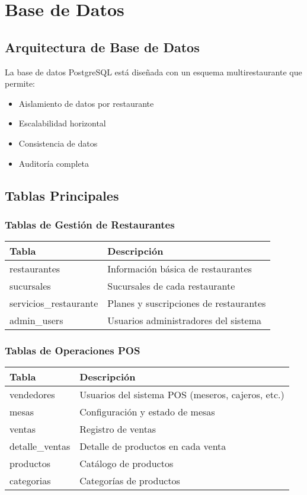 \documentclass[12pt,a4paper]{article}
\begin{document}
\section{Base de Datos}

\subsection{Arquitectura de Base de Datos}
La base de datos PostgreSQL está diseñada con un esquema multirestaurante que permite:
\begin{itemize}
    \item Aislamiento de datos por restaurante
    \item Escalabilidad horizontal
    \item Consistencia de datos
    \item Auditoría completa
\end{itemize}

\subsection{Tablas Principales}

\subsubsection{Tablas de Gestión de Restaurantes}
\begin{longtable}{|p{3cm}|p{10cm}|}
\hline
\textbf{Tabla} & \textbf{Descripción} \\
\hline
\endhead
restaurantes & Información básica de restaurantes \\
\hline
sucursales & Sucursales de cada restaurante \\
\hline
servicios\_restaurante & Planes y suscripciones de restaurantes \\
\hline
admin\_users & Usuarios administradores del sistema \\
\hline
\end{longtable}

\subsubsection{Tablas de Operaciones POS}
\begin{longtable}{|p{3cm}|p{10cm}|}
\hline
\textbf{Tabla} & \textbf{Descripción} \\
\hline
\endhead
vendedores & Usuarios del sistema POS (meseros, cajeros, etc.) \\
\hline
mesas & Configuración y estado de mesas \\
\hline
ventas & Registro de ventas \\
\hline
detalle\_ventas & Detalle de productos en cada venta \\
\hline
productos & Catálogo de productos \\
\hline
categorias & Categorías de productos \\
\hline
\end{longtable}
\end{document}
